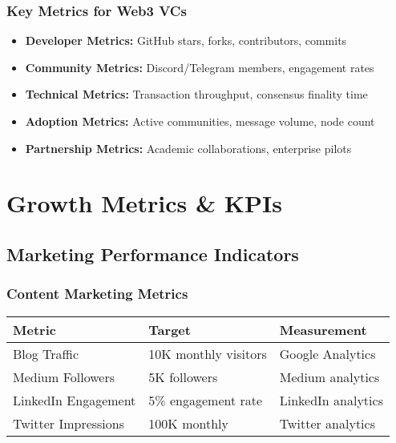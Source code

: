 \documentclass[12pt,a4paper]{article}
\begin{document}
\subsubsection{Key Metrics for Web3 VCs}
\begin{itemize}
    \item \textbf{Developer Metrics:} GitHub stars, forks, contributors, commits
    \item \textbf{Community Metrics:} Discord/Telegram members, engagement rates
    \item \textbf{Technical Metrics:} Transaction throughput, consensus finality time
    \item \textbf{Adoption Metrics:} Active communities, message volume, node count
    \item \textbf{Partnership Metrics:} Academic collaborations, enterprise pilots
\end{itemize}

\section{Growth Metrics \& KPIs}

\subsection{Marketing Performance Indicators}

\subsubsection{Content Marketing Metrics}
\begin{center}
\begin{tabular}{|l|l|l|}
\hline
\textbf{Metric} & \textbf{Target} & \textbf{Measurement} \\
\hline
Blog Traffic & 10K monthly visitors & Google Analytics \\
\hline
Medium Followers & 5K followers & Medium analytics \\
\hline
LinkedIn Engagement & 5\% engagement rate & LinkedIn analytics \\
\hline
Twitter Impressions & 100K monthly & Twitter analytics \\
\hline
\end{tabular}
\end{center}
\end{document}

